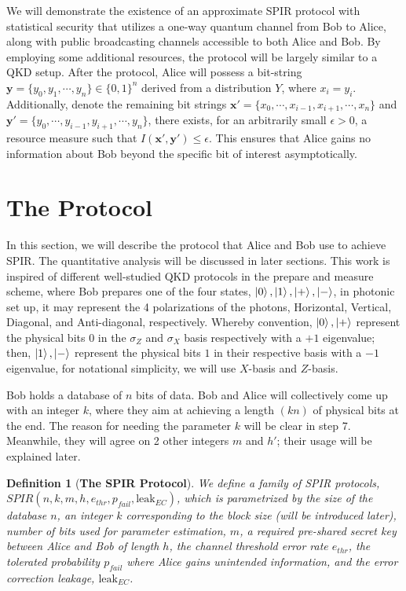 \documentclass[%
 reprint,
superscriptaddress,
 amsmath,amssymb,
 aps,
]{revtex4-2}
\newtheorem{definition}{Definition}[section]
\begin{document}
We will demonstrate the existence of an approximate SPIR protocol with statistical security that utilizes a one-way quantum channel from Bob to Alice, along with public broadcasting channels accessible to both Alice and Bob. By employing some additional resources, the protocol will be largely similar to a QKD setup. After the protocol, Alice will possess a bit-string \( \mathbf{y} = \{y_0, y_1, \cdots, y_n\} \in \{0, 1\}^n \) derived from a distribution \( Y \), where \( x_i = y_i \). Additionally, denote the remaining bit strings \( \mathbf{x'} = \{x_0, \cdots, x_{i-1}, x_{i+1}, \cdots, x_n\} \) and \( \mathbf{y'} = \{y_0, \cdots, y_{i-1}, y_{i+1}, \cdots, y_n\} \), there exists, for an arbitrarily small \( \epsilon > 0 \), a resource measure such that \( I(\mathbf{x'}, \mathbf{y'}) \le \epsilon \). This ensures that Alice gains no information about Bob beyond the specific bit of interest asymptotically.

\section{The Protocol}
\label{sec:the_protocol}
In this section, we will describe the protocol that Alice and Bob use to achieve SPIR. The quantitative analysis will be discussed in later sections. This work is inspired of different well-studied QKD protocols in the prepare and measure scheme, where Bob prepares one of the four states, $\ket{0}, \ket{1}, \ket{+}, \ket{-}$, in photonic set up, it may represent the 4 polarizations of the photons, Horizontal, Vertical, Diagonal, and Anti-diagonal, respectively. Whereby convention, $\ket{0}, \ket{+}$ represent the physical bits $0$ in the $\sigma_Z$ and $\sigma_X$ basis respectively with a $+1$ eigenvalue; then, $\ket{1}, \ket{-}$ represent the physical bits $1$ in their respective basis with a $-1$ eigenvalue, for notational simplicity, we will use $X$-basis and $Z$-basis.


Bob holds a database of $n$ bits of data. Bob and Alice will collectively come up with an integer $k$, where they aim at achieving a length $(kn)$ of physical bits at the end. The reason for needing the parameter $k$ will be clear in step 7. Meanwhile, they will agree on 2 other integers $m$ and $h'$; their usage will be explained later. 


\begin{definition}[\textbf{The SPIR Protocol}]
    We define a family of SPIR protocols, $SPIR(n, k, m, h, e_{thr}, p_{fail}, \text{leak}_{EC})$, which is parametrized by the size of the database $n$, an integer $k$ corresponding to the block size (will be introduced later), number of bits used for parameter estimation, $m$, a required pre-shared secret key between Alice and Bob of length $h$, the channel threshold error rate $e_{thr}$, the tolerated probability $p_{fail}$ where Alice gains unintended information, and the error correction leakage, $\text{leak}_{EC}$.
\end{definition}
\end{document}
